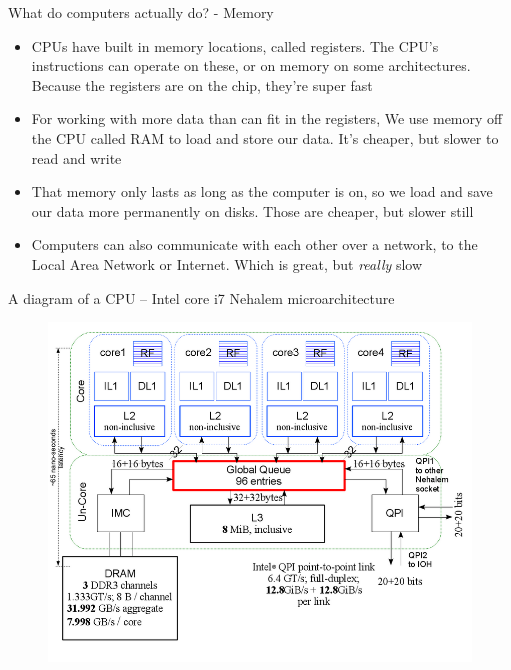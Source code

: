\documentclass{beamer}
\begin{document}
\begin{frame}{What do computers actually do? - Memory}
	\begin{itemize}
		\item CPUs have built in memory locations, called registers. The CPU's instructions
			can operate on these, or on memory on some architectures. Because the registers are on the chip, they're super fast
		\item For working with more data than can fit in the registers, We use memory off the CPU called RAM to load and store our data. It's cheaper, but slower to read and write
		\item That memory only lasts as long as the computer is on, so we load and save our data more permanently on disks. Those are cheaper, but slower still
		\item Computers can also communicate with each other over a network, to the Local
			Area Network or Internet. Which is great, but \emph{really} slow
	\end{itemize}
\end{frame}

\begin{frame}{A diagram of a CPU -- Intel core i7 Nehalem microarchitecture}
	\begin{figure}
		\includegraphics[scale=0.5]{Intel_core_i7.png}
	\end{figure}
\end{frame}
\end{document}

